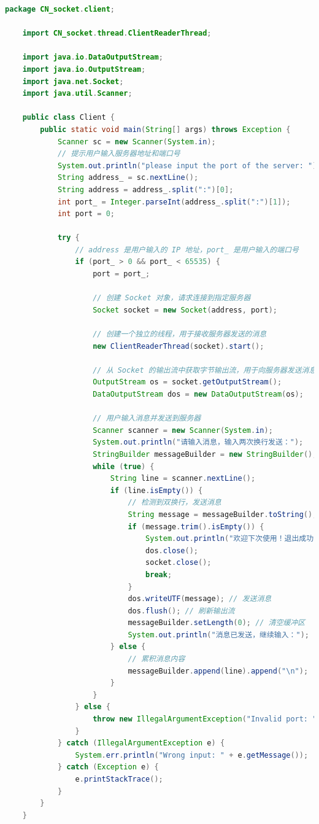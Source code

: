 \documentclass{article}
\begin{document}
	\begin{lstlisting}[language=Java, title=Client.java, tabsize=4]
    package CN_socket.client;
    
    import CN_socket.thread.ClientReaderThread;
    
    import java.io.DataOutputStream;
    import java.io.OutputStream;
    import java.net.Socket;
    import java.util.Scanner;
    
    public class Client {
        public static void main(String[] args) throws Exception {
            Scanner sc = new Scanner(System.in);
            // 提示用户输入服务器地址和端口号
            System.out.println("please input the port of the server: ");
            String address_ = sc.nextLine();
            String address = address_.split(":")[0];
            int port_ = Integer.parseInt(address_.split(":")[1]);
            int port = 0;
            
            try {
            	// address 是用户输入的 IP 地址，port_ 是用户输入的端口号
            	if (port_ > 0 && port_ < 65535) {
            		port = port_;
            		
            		// 创建 Socket 对象，请求连接到指定服务器
            		Socket socket = new Socket(address, port);
            		
            		// 创建一个独立的线程，用于接收服务器发送的消息
            		new ClientReaderThread(socket).start();
            		
            		// 从 Socket 的输出流中获取字节输出流，用于向服务器发送消息
            		OutputStream os = socket.getOutputStream();
            		DataOutputStream dos = new DataOutputStream(os);
            		
            		// 用户输入消息并发送到服务器
            		Scanner scanner = new Scanner(System.in);
            		System.out.println("请输入消息，输入两次换行发送：");
            		StringBuilder messageBuilder = new StringBuilder();
            		while (true) {
            			String line = scanner.nextLine();
            			if (line.isEmpty()) {
            				// 检测到双换行，发送消息
            				String message = messageBuilder.toString();
            				if (message.trim().isEmpty()) {
            					System.out.println("欢迎下次使用！退出成功");
            					dos.close();
            					socket.close();
            					break;
            				}
            				dos.writeUTF(message); // 发送消息
            				dos.flush(); // 刷新输出流
            				messageBuilder.setLength(0); // 清空缓冲区
            				System.out.println("消息已发送，继续输入：");
            			} else {
            				// 累积消息内容
            				messageBuilder.append(line).append("\n");
            			}
            		}
            	} else {
            		throw new IllegalArgumentException("Invalid port: " + port_);
            	}
            } catch (IllegalArgumentException e) {
            	System.err.println("Wrong input: " + e.getMessage());
            } catch (Exception e) {
            	e.printStackTrace();
            }
    	}
    }
	\end{lstlisting}
	
\end{document}
